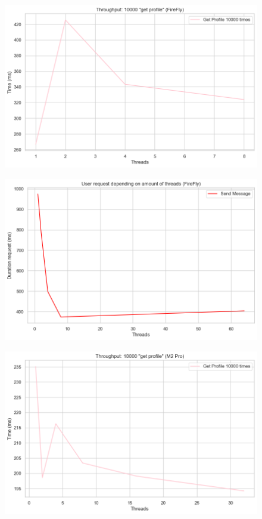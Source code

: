 \documentclass[a4paper]{article}
\begin{document}
\begin{figure}[H]
	\centering
	\includegraphics[width = \linewidth]{Images/ThroughputPtofileFirefly.png}
	\caption{}
\end{figure}
\begin{figure}[H]
	\centering
	\includegraphics[width = \linewidth]{Images/ThroughputMessageFirefly.png}
	\caption{}
\end{figure}
\begin{figure}[H]
	\centering
	\includegraphics[width = \linewidth]{Images/ThroughputProfile.png}
	\caption{}
\end{figure}
\end{document}
